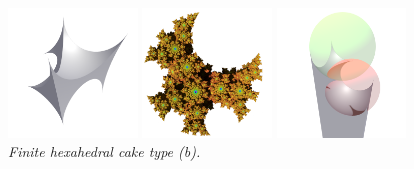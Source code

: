 \documentclass[suppldata, dvipdfmx]{interact}
\theoremstyle{plain}%
\theoremstyle{definition}
\theoremstyle{remark}
\theoremstyle{problemstyle}
\begin{document}
\begin{figure}[H]
 \begin{minipage}{0.5\textwidth}
  \begin{minipage}[t]{0.24\textwidth}
   \centering \includegraphics[width=1.35in, height=1.35in,
   keepaspectratio]{./img/sphairahedron/hexahedralCake2/sphairahedronFinite_b.png}
  \end{minipage}
  \hspace*{\fill}
  \begin{minipage}[t]{0.24\textwidth}
   \centering
   \includegraphics[width=1.35in, height=1.35in,
   keepaspectratio]{./img/sphairahedron/hexahedralCake2/limitsetFinite_b.png}
  \end{minipage}
  \hspace*{\fill}
  \caption{\textit{Finite hexahedral cake type (b).}}
  \label{}
 \end{minipage}
 \hspace*{\fill}
 \begin{minipage}{0.5\textwidth}
  \begin{minipage}[t]{0.24\textwidth}
   \centering
   \includegraphics[width=1.35in, height=1.35in,
   keepaspectratio]{./img/sphairahedron/hexahedralCake2/sphairahedronInf_b.png}
  \end{minipage}
  \hspace*{\fill}

\end{minipage}
\end{figure}
\end{document}
